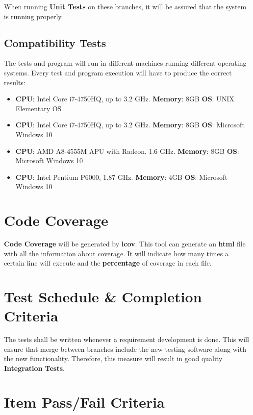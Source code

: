 \documentclass[12pt]{article}
\begin{document}
When running \textbf{Unit Tests} on these branches, it will be assured that the system is running properly. 

\subsection*{Compatibility Tests}

The tests and program will run in different machines running different operating systems. Every test and program execution will have to produce the correct results:

\begin{itemize}  
\item \textbf{CPU}: Intel Core i7-4750HQ, up to 3.2 GHz. \textbf{Memory}: 8GB \textbf{OS}: UNIX Elementary OS
\item \textbf{CPU}: Intel Core i7-4750HQ, up to 3.2 GHz. \textbf{Memory}: 8GB \textbf{OS}: Microsoft Windows 10
\item \textbf{CPU}: AMD A8-4555M APU with Radeon, 1.6 GHz. \textbf{Memory}: 8GB \textbf{OS}: Microsoft Windows 10
\item \textbf{CPU}: Intel Pentium P6000, 1.87 GHz. \textbf{Memory}: 4GB \textbf{OS}: Microsoft Windows 10
\end{itemize}

\section*{Code Coverage}

\textbf{Code Coverage} will be generated by \textbf{lcov}. This tool can generate an \textbf{html} file with all the information about coverage. It will indicate how many times a certain line will execute and the \textbf{percentage} of coverage in each file.

\section*{Test Schedule \& Completion Criteria}

The tests shall be written whenever a requirement development is done. This will ensure that merge between branches include the new testing software along with the new functionality. Therefore, this measure will result in good quality \textbf{Integration Tests}.

\section*{Item Pass/Fail Criteria}
\end{document}
